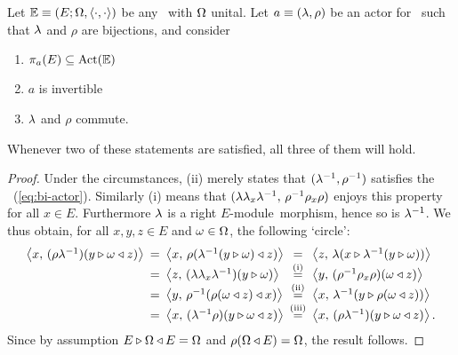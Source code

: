 \begin{lemma} \label{lem:invertibility_comm_pi}
  Let\/ $\mathbb{E} \equiv (E; \Omega, \langle\cdot, \cdot\rangle)$ be any \context\ with\/ $\Omega$ unital.
  Let $a\equiv(\lambda,\rho)$ be an actor for\/ \EE\ such that $\lambda$ and $\rho$
  are bijections, and consider
  \begin{enumerate}
     \item $\pi_a(E) \subseteq \mbox{\rm Act}(\mathbb{E})$
     \item $a$ is \EEdash invertible
     \item $\lambda$ and $\rho$ commute.
  \end{enumerate}
  Whenever two of these statements are satisfied, all three of them will hold.
\end{lemma}
\begin{proof}
  Under the circumstances, (ii) merely states that $(\lambda^{-1},\rho^{-1})$
  satisfies the \biap\ (\ref{eq:bi-actor}).
  Similarly (i) means that $(\lambda\lambda_x\lambda^{-1}, \, \rho^{-1}\rho_x\rho)$
  enjoys this property for all $x\in E$.
  Furthermore $\lambda$ is a right \mbox{$E$-module}\ morphism, hence so is $\lambda^{-1}$.
  We thus obtain, for all $x,y,z \in E$ and $\omega \in \Omega$, the following \lq circle\rq :
  $$ \begin{array}{lclcl}
          \pairM{x}{(\rho\lam^{-1})(y\lact \om \ract z)}
      \!\!\!&=& \!\!\!
          \pairM{x}{\rho(\lam^{-1}(y\lact \om) \ract z)}
      \!\!\!&=& \!\!\!
            \pairM{z}{\lam(x \lact \lam^{-1}(y\lact \om))}  \\
      \!\!\!&=& \!\!\!
            \pairM{z}{(\lam\lam_x\lam^{-1})(y\lact \om)}
      \!\!\!&\stackrel{\rm (i)}{=}&\!\!\!
            \pairM{y}{(\rho^{-1}\rho_x\rho)(\om \ract z)}   \\
      \!\!\!&=&\!\!\!
            \pairM{y}{\rho^{-1}(\rho(\om \ract z) \ract x)}
      \!\!\!&\stackrel{\rm (ii)}{=}&\!\!\!
            \pairM{x}{\lam^{-1}(y \lact \rho(\om \ract z))}  \\
      \!\!\!&=&\!\!\!
            \pairM{x}{(\lam^{-1}\rho)(y \lact \om \ract z)}
      \!\!\!&\stackrel{\rm (iii)}{=}&\!\!\!
            \pairM{x}{(\rho\lam^{-1})(y\lact \om \ract z)}.
  \end{array} $$
  Since by assumption $E \triangleright \Omega \triangleleft E = \Omega$ and $\rho(\Omega \triangleleft E)=\Omega$,
  the result follows.
\end{proof}
